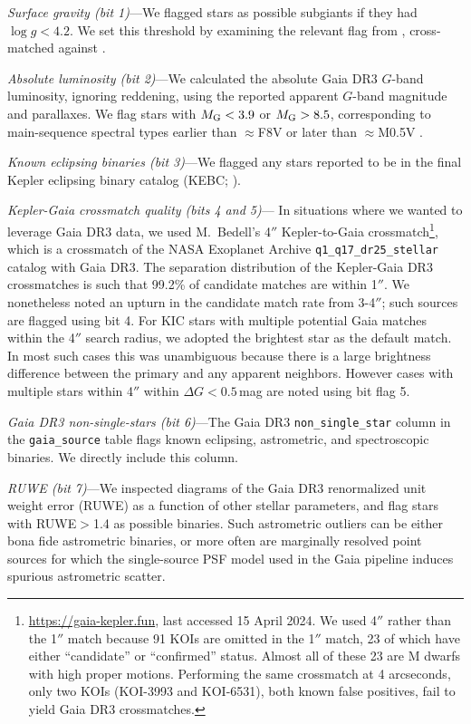 \documentclass[11pt,twocolumn,tighten]{aastex63}
\begin{document}
{\it Surface gravity (bit 1)}---We flagged stars as possible subgiants
if they had $\log g < 4.2$.  We set this threshold by examining the
relevant flag from \citet{berger_2018_radii_evolnstates},
cross-matched against \citet{Berger_2020a_catalog}.

{\it Absolute luminosity (bit 2)}---We calculated the absolute Gaia
DR3 $G$-band luminosity, ignoring reddening, using the reported
apparent $G$-band magnitude and parallaxes.  We flag stars with
$M_{\rm G} < 3.9$ or $M_{\rm G} > 8.5$, corresponding to main-sequence
spectral types earlier than $\approx$F8V or later than $\approx$M0.5V
\citep{Pecaut_2013}.

{\it Known eclipsing binaries (bit 3)}---We flagged any stars reported
to be in the final Kepler eclipsing binary catalog (KEBC;
\citealt{2016AJ....151...68K}).

{\it Kepler-Gaia crossmatch quality (bits 4 and 5)}--- In situations
where we wanted to leverage Gaia DR3 data, we used M.~Bedell's 4$''$
Kepler-to-Gaia crossmatch\footnote{\url{https://gaia-kepler.fun}, last
accessed 15 April 2024.  We used 4$''$ rather than the 1$''$ match
because 91 KOIs are omitted in the 1$''$ match, 23 of which have
either ``candidate'' or ``confirmed'' status.  Almost all of these 23
are M dwarfs with high proper motions.  Performing the same crossmatch
at 4 arcseconds, only two KOIs (KOI-3993 and KOI-6531), both known
false positives, fail to yield Gaia DR3 crossmatches.}, which is a
crossmatch of the NASA Exoplanet Archive
\texttt{q1\_q17\_dr25\_stellar} catalog with Gaia DR3.  The separation
distribution of the Kepler-Gaia DR3 crossmatches is such that 99.2\%
of candidate matches are within 1$''$.   We nonetheless noted an
upturn in the candidate match rate from 3-4$''$; such sources are
flagged using bit 4.  For KIC stars with multiple potential Gaia
matches within the 4$''$ search radius, we adopted the brightest star
as the default match.  In most such cases this was unambiguous because
there is a large brightness difference between the primary and any
apparent neighbors.  However cases with multiple stars within 4$''$
within $\Delta G$$<$$0.5$\,mag are noted using bit flag 5.  

{\it Gaia DR3 non-single-stars (bit 6)}---The Gaia DR3
\texttt{non\_single\_star} column in the \texttt{gaia\_source} table
flags known eclipsing, astrometric, and spectroscopic binaries.  We
directly include this column.

{\it RUWE (bit 7)}---We inspected diagrams of the Gaia DR3 renormalized
unit weight error
(RUWE) as a function of other stellar parameters, %
and flag stars with RUWE$>$1.4 as possible binaries.  Such astrometric
outliers can be either bona fide astrometric binaries, or more often
are marginally resolved point sources for which the single-source PSF
model used in the Gaia pipeline induces spurious astrometric scatter.
\end{document}
